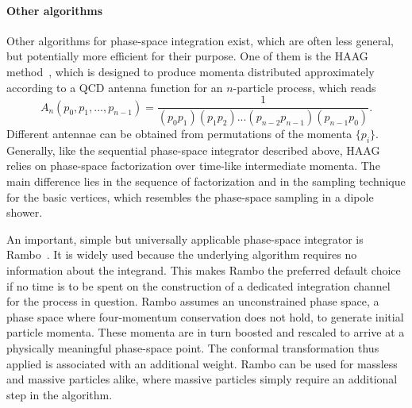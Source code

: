 \paragraph{Other algorithms}
Other algorithms for phase-space integration exist, which are 
often less general, but potentially more efficient for their purpose.
One of them is the HAAG method~\cite{vanHameren:2002tc},
which is designed to produce momenta distributed approximately according to 
a QCD antenna function for an $n$-particle process, which reads
\begin{equation}\label{eq:antenna}
  A_{n}(p_0,p_1,...,p_{n-1})=\frac{1}{
    (p_0 p_1)(p_1 p_2)...(p_{n-2} p_{n-1})(p_{n-1} p_0)}.
\end{equation}
Different antennae can be obtained from permutations of the momenta $\{p_i\}$.
Generally, like the sequential phase-space integrator described above,
HAAG relies on phase-space factorization over time-like intermediate 
momenta.  The main difference lies in the sequence of factorization 
and in the sampling technique for the basic vertices,
which resembles the phase-space sampling in a dipole shower.

An important, simple but universally applicable phase-space integrator is 
Rambo~\cite{Kleiss:1985gy}. It is widely used because the underlying
algorithm requires no information about the integrand. This makes
Rambo the preferred default choice if no time is to be spent on the 
construction of a dedicated integration channel for the process in question.
Rambo assumes an unconstrained phase space, \ie a phase space where 
four-momentum conservation does not hold, to generate initial particle
momenta. These momenta are in turn boosted and rescaled to arrive at 
a physically meaningful phase-space point. The conformal transformation 
thus applied is associated with an additional weight. Rambo can be used
for massless and massive particles alike, where massive particles simply
require an additional step in the algorithm.
